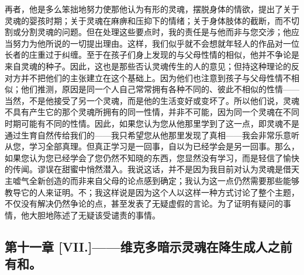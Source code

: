 再者，他是多么笨拙地努力使那他认为有形的灵魂，摆脱身体的情欲，提出了关于灵魂的婴孩时期；关于灵魂在麻痹和压抑下的情绪；关于身体肢体的截断，而不切割或分割灵魂的问题。但在处理这些要点时，我的责任是与他而非与您交涉；他应当努力为他所说的一切提出理由。这样，我们似乎就不会想就年轻人的作品对一位长者的庄重过于纠缠。至于在孩子们身上发现的与父母性情的相似，他并不争论是来自灵魂的种子。因此，这也是那些否认灵魂传生的人的意见；但持这种理论的反对方并不把他们的主张建立在这个基础上。因为他们也注意到孩子与父母性情不相似；他们推测，原因是同一个人自己常常拥有各种不同的、彼此不相似的性情——当然，不是他接受了另一个灵魂，而是他的生活变好或变坏了。所以他们说，灵魂不具有产生它的那个灵魂所拥有的同一性情，并非不可能，因为同一个灵魂在不同时期可能有不同的性情。因此，如果您认为您从他那里学到了这一点，即灵魂不是通过生育自然传给我们的——我只希望您从他那里发现了真相——我会非常乐意听从您，学习全部真理。但真正学习是一回事，自以为已经学会是另一回事。那么，如果您认为您已经学会了您仍然不知晓的东西，您显然没有学习，而是轻信了愉快的传闻。谬误在甜蜜中悄然潜入。我说这话，并不是因为我目前对认为灵魂是借天主嘘气全新创造的而非来自父母的论点感到确定；我认为这一点仍然需要那些能够教导它的人来证明。不；我这样说是因为这个人以这样一种方式讨论了整个主题，不仅没有解决仍然争论的点，甚至发表了无疑虚假的言论。为了证明有疑问的事情，他大胆地陈述了无疑该受谴责的事情。\par


\subsection{第十一章 [VII.]——维克多暗示灵魂在降生成人之前有和。}

